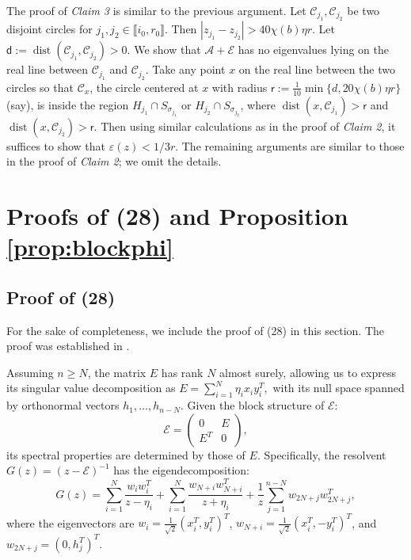 \documentclass[reqno]{amsart}
\DeclareMathOperator{\dist}{dist}
\newcommand{\eps}{\varepsilon}
\theoremstyle{plain}
\theoremstyle{definition}
\begin{document}
\medskip

The proof of \emph{Claim 3} is similar to the previous argument. Let $\mathcal C_{j_1}, \mathcal C_{j_2}$ be two disjoint circles for $j_1, j_2 \in \llbracket i_0, r_0\rrbracket$. Then $|z_{j_1}-z_{j_2}| > 40 \chi(b) \eta r$. Let $\mathsf d:=\dist(\mathcal C_{j_1}, \mathcal C_{j_2})>0.$ We show that $\mathcal A + \mathcal E$ has no eigenvalues lying on the real line between $\mathcal C_{j_1}$ and $\mathcal C_{j_2}$. Take any point $x$ on the real line between the two circles so that $\mathcal C_x$, the circle centered at $x$ with radius $\mathsf r:=\frac{1}{10}\min\{d, 20\chi(b)\eta r\}$ (say), is inside the region $H_{j_1}\cap S_{\sigma_{j_1}}$ or $H_{j_2}\cap S_{\sigma_{j_2}}$, where $\dist(x, \mathcal C_{j_1}) > \mathsf r$ and $\dist(x, \mathcal C_{j_2}) > \mathsf r$. Then using similar calculations as in the proof of \emph{Claim 2}, it suffices to show that $\eps(z)<{1}/{3r}$. The remaining arguments are similar to those in the proof of \emph{Claim 2}; we omit the details.


\section{Proofs of (28) and Proposition \ref{prop:blockphi}} \label{app:proof2parts}

\subsection{Proof of (28)}
For the sake of completeness, we include the proof of (28) in this section. The proof was established in \cite[Appendix B.4]{OVW22}.

Assuming $n \geq N$, the matrix $E$ has rank $N$ almost surely, allowing us to express its singular value decomposition as $E = \sum_{i=1}^N \eta_i x_i y_i^T,$ 
with its null space spanned by orthonormal vectors $h_1,\ldots,h_{n-N}$. Given the block structure of $\mathcal{E}$:
\[
\mathcal{E} = \begin{pmatrix} 0 & E\\ E^T & 0\end{pmatrix},
\]
its spectral properties are determined by those of $E$. Specifically, the resolvent $G(z)=(z-\mathcal{E})^{-1}$ has the eigendecomposition:
\[
G(z) = \sum_{i=1}^N \frac{w_i w_i^T}{z-\eta_i} + \sum_{i=1}^N \frac{w_{N+i} w_{N+i}^T}{z+\eta_i} + \frac{1}{z}\sum_{j=1}^{n-N} w_{2N+j} w_{2N+j}^{T},
\]
where the eigenvectors are $w_i =\frac{1}{\sqrt 2} (x_i^T, y_i^T)^T$, $w_{N+i} =\frac{1}{\sqrt 2} (x_i^T, -y_i^T)^T$, and $w_{2N+j} = ( 0, h_j^T)^T$.
\end{document}
